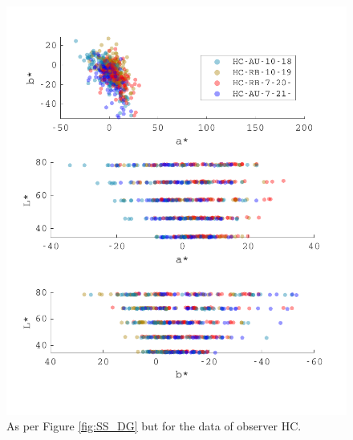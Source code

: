 \begin{figure}[htbp]
\includegraphics[max width=1.2\textwidth,center]{figs/SmallSphere/HC.pdf}
\caption{As per Figure \ref{fig:SS_DG} but for the data of observer HC.}
\label{fig:SS_HC}
\end{figure}

